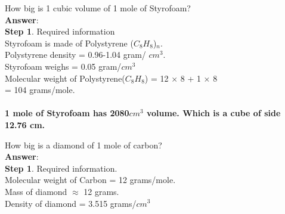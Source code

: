\documentclass[11pt]{exam}
\begin{document}
\begin{questions}


\question
\label{Q5:Styrofoam}

How big is 1 cubic volume of 1 mole of Styrofoam?\\
\textbf{Answer}: \\
\textbf{Step 1}. Required information \\
Styrofoam is made of Polystyrene ($C_{8}H_{8}$)$_{n}$. \\
Polystyrene density = 0.96-1.04 gram/ $cm^{3}$.\\
Styrofoam weighs = 0.05 gram/$cm^{3}$ \\
Molecular weight of Polystyrene($C_{8}H_{8}$) = 12 $\times$ 8 + 1 $\times$ 8\\ = 104 grams/mole.\\ 

 \\ 

\textbf{1 mole of Styrofoam has 2080$cm^{3}$ volume. Which is a cube of side 12.76 cm.} \\


\question
\label{Q6:Diamond}

How big is a diamond of 1 mole of carbon?\\
\textbf{Answer}: \\
\textbf{Step 1}. Required information. \\
                 Molecular weight of Carbon = 12 grams/mole. \\
                 Mass of diamond $\approx$ 12 grams. \\
                 Density of diamond = 3.515 grams/$cm^{3}$ \\ 
                                  
\fbox{\begin{minipage}{38em}   
               

\end{minipage}}
\end{questions}
\end{document}
